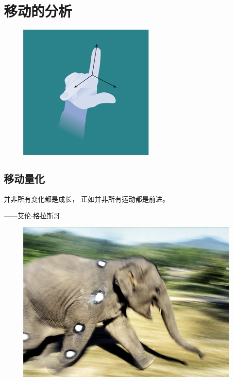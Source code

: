 \part{移动的分析}

\begin{figure}[!htb]
	\centering
	\includegraphics[width=0.4\linewidth]{chap7/7_0_0}
	\caption*{ \label{fig:7_0_0}}
\end{figure}



\chapter{移动量化} \label{chap:chap7}


并非所有变化都是成长，
正如并非所有运动都是前进。
\begin{flushright}
	——艾伦$\cdot$格拉斯哥
\end{flushright}

\begin{figure}[!htb]
	\centering
	\includegraphics[width=1.0\linewidth]{chap7/7_0}
	\caption*{ \label{fig:7_0}}
\end{figure}

